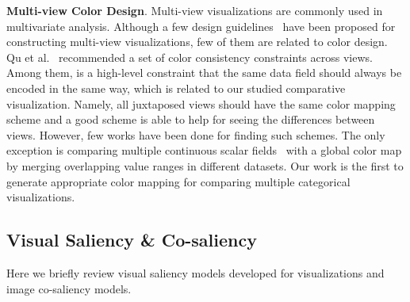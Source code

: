 \vspace{1.5mm}
\noindent\textbf{Multi-view Color Design}.
Multi-view visualizations are commonly used in multivariate analysis. Although a few design guidelines~\cite{wang2000guidelines} have been proposed for constructing multi-view visualizations, few of them are related to color design. Qu et al.~\cite{qu2017keeping} recommended a set of color consistency constraints across views.
Among them, is a high-level constraint that the same data field should always be encoded in the same way, which is related to our studied comparative visualization. Namely, all juxtaposed views should have the same color mapping scheme and a good scheme is able to help for seeing the differences between views.
However, few works have been done for finding such schemes. The only exception is comparing multiple continuous scalar fields~\cite{Tominski08} with a global color map by merging overlapping value ranges in different datasets. Our work is the first to generate appropriate color mapping for comparing multiple categorical visualizations.

\subsection{Visual Saliency \& Co-saliency}
Here we briefly review visual saliency models developed for visualizations and image co-saliency models.

